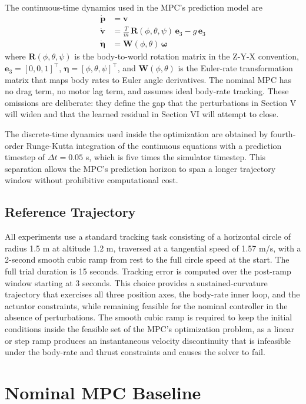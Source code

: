 \documentclass[conference]{IEEEtran}
\begin{document}
The continuous-time dynamics used in the MPC's prediction model are
\begin{align}
\dot{\mathbf{p}} &= \mathbf{v} \\
\dot{\mathbf{v}} &= \frac{T}{m}\, \mathbf{R}(\phi, \theta, \psi)\, \mathbf{e}_3 - g\, \mathbf{e}_3 \\
\dot{\boldsymbol{\eta}} &= \mathbf{W}(\phi, \theta)\, \boldsymbol{\omega}
\end{align}
where $\mathbf{R}(\phi, \theta, \psi)$ is the body-to-world rotation matrix in the Z-Y-X convention, $\mathbf{e}_3 = [0, 0, 1]^\top$, $\boldsymbol{\eta} = [\phi, \theta, \psi]^\top$, and $\mathbf{W}(\phi, \theta)$ is the Euler-rate transformation matrix that maps body rates to Euler angle derivatives. The nominal MPC has no drag term, no motor lag term, and assumes ideal body-rate tracking. These omissions are deliberate: they define the gap that the perturbations in Section V will widen and that the learned residual in Section VI will attempt to close.

The discrete-time dynamics used inside the optimization are obtained by fourth-order Runge-Kutta integration of the continuous equations with a prediction timestep of $\Delta t = 0.05$ s, which is five times the simulator timestep. This separation allows the MPC's prediction horizon to span a longer trajectory window without prohibitive computational cost.

\subsection{Reference Trajectory}
All experiments use a standard tracking task consisting of a horizontal circle of radius 1.5 m at altitude 1.2 m, traversed at a tangential speed of 1.57 m/s, with a 2-second smooth cubic ramp from rest to the full circle speed at the start. The full trial duration is 15 seconds. Tracking error is computed over the post-ramp window starting at 3 seconds. This choice provides a sustained-curvature trajectory that exercises all three position axes, the body-rate inner loop, and the actuator constraints, while remaining feasible for the nominal controller in the absence of perturbations. The smooth cubic ramp is required to keep the initial conditions inside the feasible set of the MPC's optimization problem, as a linear or step ramp produces an instantaneous velocity discontinuity that is infeasible under the body-rate and thrust constraints and causes the solver to fail.

\section{Nominal MPC Baseline}
\end{document}
